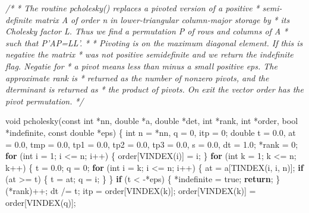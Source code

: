 \documentclass[12pt,]{article}
\newenvironment{Shaded}{\begin{snugshade}}{\end{snugshade}}
\newcommand{\CommentTok}[1]{\textcolor[rgb]{0.56,0.35,0.01}{\textit{#1}}}
\newcommand{\ControlFlowTok}[1]{\textcolor[rgb]{0.13,0.29,0.53}{\textbf{#1}}}
\newcommand{\DataTypeTok}[1]{\textcolor[rgb]{0.13,0.29,0.53}{#1}}
\newcommand{\DecValTok}[1]{\textcolor[rgb]{0.00,0.00,0.81}{#1}}
\newcommand{\FloatTok}[1]{\textcolor[rgb]{0.00,0.00,0.81}{#1}}
\newcommand{\NormalTok}[1]{#1}
\begin{document}
\begin{Shaded}
\begin{Highlighting}[]
\CommentTok{/*}
\CommentTok{ * The routine pcholesky() replaces a pivoted version of a positive}
\CommentTok{ * semi-definite matrix A of order n in lower-triangular column-major storage by}
\CommentTok{ * its Cholesky factor L. Thus we find a permutation P of rows and columns of A}
\CommentTok{ * such that P'AP=LL'.}
\CommentTok{ *}
\CommentTok{ * Pivoting is on the maximum diagonal element. If this is negative the matrix}
\CommentTok{ * was not positive semidefinite and we return the indefinite flag.  Negatie for}
\CommentTok{ * a pivot means less than minus a small positive eps. The approximate rank is}
\CommentTok{ * returned as the number of nonzero pivots, and the dterminant is returned as}
\CommentTok{ * the product of pivots. On exit the vector order has the pivot permutation.}
\CommentTok{ */}

\DataTypeTok{void}\NormalTok{ pcholesky(}\DataTypeTok{const} \DataTypeTok{int}\NormalTok{ *nn, }\DataTypeTok{double}\NormalTok{ *a, }\DataTypeTok{double}\NormalTok{ *det, }\DataTypeTok{int}\NormalTok{ *rank, }\DataTypeTok{int}\NormalTok{ *order,}
               \DataTypeTok{bool}\NormalTok{ *indefinite, }\DataTypeTok{const} \DataTypeTok{double}\NormalTok{ *eps) \{}
  \DataTypeTok{int}\NormalTok{ n = *nn, q = }\DecValTok{0}\NormalTok{, itp = }\DecValTok{0}\NormalTok{;}
  \DataTypeTok{double}\NormalTok{ t = }\FloatTok{0.0}\NormalTok{, at = }\FloatTok{0.0}\NormalTok{, tmp = }\FloatTok{0.0}\NormalTok{, tp1 = }\FloatTok{0.0}\NormalTok{, tp2 = }\FloatTok{0.0}\NormalTok{, tp3 = }\FloatTok{0.0}\NormalTok{, s = }\FloatTok{0.0}\NormalTok{,}
\NormalTok{         dt = }\FloatTok{1.0}\NormalTok{;}
\NormalTok{  *rank = }\DecValTok{0}\NormalTok{;}
  \ControlFlowTok{for}\NormalTok{ (}\DataTypeTok{int}\NormalTok{ i = }\DecValTok{1}\NormalTok{; i <= n; i++) \{}
\NormalTok{    order[VINDEX(i)] = i;}
\NormalTok{  \}}
  \ControlFlowTok{for}\NormalTok{ (}\DataTypeTok{int}\NormalTok{ k = }\DecValTok{1}\NormalTok{; k <= n; k++) \{}
\NormalTok{    t = }\FloatTok{0.0}\NormalTok{;}
\NormalTok{    q = }\DecValTok{0}\NormalTok{;}
    \ControlFlowTok{for}\NormalTok{ (}\DataTypeTok{int}\NormalTok{ i = k; i <= n; i++) \{}
\NormalTok{      at = a[TINDEX(i, i, n)];}
      \ControlFlowTok{if}\NormalTok{ (at >= t) \{}
\NormalTok{        t = at;}
\NormalTok{        q = i;}
\NormalTok{      \}}
\NormalTok{    \}}
    \ControlFlowTok{if}\NormalTok{ (t < -*eps) \{}
\NormalTok{      *indefinite = true;}
      \ControlFlowTok{return}\NormalTok{;}
\NormalTok{    \}}
\NormalTok{    (*rank)++;}
\NormalTok{    dt /= t;}
\NormalTok{    itp = order[VINDEX(k)];}
\NormalTok{    order[VINDEX(k)] = order[VINDEX(q)];}

\end{Highlighting}
\end{Shaded}
\end{document}
